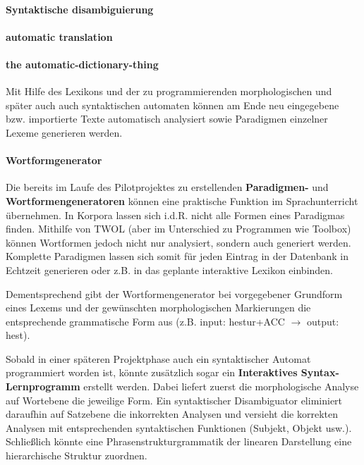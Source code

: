 \documentclass[a4paper,12pt]{article}
\begin{document}
\paragraph{Syntaktische disambiguierung}

\paragraph{automatic translation} 

\paragraph{the automatic-dictionary-thing} Mit Hilfe des Lexikons und der zu programmierenden morphologischen und später auch auch syntaktischen automaten können am Ende neu eingegebene bzw. importierte Texte automatisch analysiert sowie Paradigmen einzelner Lexeme generieren werden.

\paragraph{Wortformgenerator} Die bereits im Laufe des Pilotprojektes zu erstellenden \textbf{Paradigmen-} und \textbf{Wortformengeneratoren} können eine praktische Funktion im Sprachunterricht übernehmen. In Korpora lassen sich i.d.R. nicht alle Formen eines Paradigmas finden. Mithilfe von TWOL (aber im Unterschied zu Programmen wie Toolbox) können Wortformen jedoch nicht nur analysiert, sondern auch generiert werden. Komplette Paradigmen lassen sich somit für jeden Eintrag in der Datenbank in Echtzeit generieren oder z.B. in das geplante interaktive Lexikon einbinden.

Dementsprechend gibt der Wortformengenerator bei vorgegebener Grundform eines Lexems und der gewünschten morphologischen Markierungen die entsprechende grammatische Form aus (z.B. input: hestur+ACC $\rightarrow$ output: hest).%

Sobald in einer späteren Projektphase auch ein syntaktischer Automat programmiert worden ist, könnte zusätzlich sogar ein \textbf{Interaktives Syntax-Lernprogramm} erstellt werden. Dabei liefert zuerst die morphologische Analyse auf Wortebene die jeweilige Form. Ein syntaktischer Disambiguator eliminiert daraufhin auf Satzebene die inkorrekten Analysen und versieht die korrekten Analysen mit entsprechenden syntaktischen Funktionen (Subjekt, Objekt usw.). Schließlich könnte eine Phrasenstrukturgrammatik der linearen Darstellung eine hierarchische Struktur zuordnen.
\end{document}
